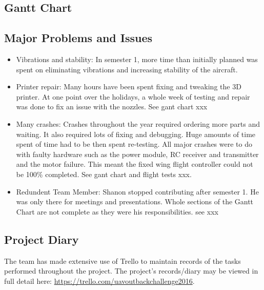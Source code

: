 
\subsection{Gantt Chart}

\subsection{Major Problems and Issues}
\begin{itemize}
	\item Vibrations and stability: In semester 1, more time than initially planned was spent on eliminating vibrations and increasing stability of the aircraft. 
	\item Printer repair: Many hours have been spent fixing and tweaking the 3D printer.  At one point over the holidays, a whole week of testing and repair was done to fix an issue with the nozzles. See gant chart xxx
	\item Many crashes: Crashes throughout the year required ordering more parts and waiting. It also required lots of fixing and debugging. Huge amounts of time spent of time had to be then spent re-testing. All major crashes were to do with faulty hardware such as the power module, RC receiver and transmitter and the motor failure. This meant the fixed wing flight controller could not be 100\% completed. See gant chart and flight tests xxx.
	\item Redundent Team Member: Shanon stopped contributing after semester 1. He was only there for meetings and presentations. Whole sections of the Gantt Chart are not complete as they were his responsibilities. see xxx
\end{itemize}

\subsection{Project Diary}
The team has made extensive use of Trello to maintain records of the tasks performed throughout the project. The project's records/diary may be viewed in full detail here: \url{https://trello.com/uavoutbackchallenge2016}.

